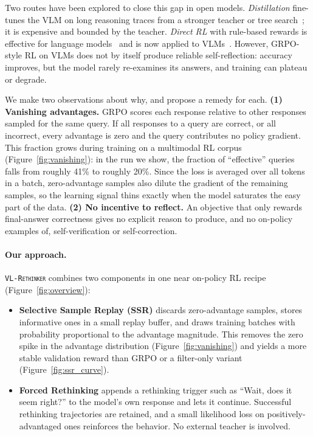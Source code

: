 \documentclass{article}
\newcommand{\model}{\texttt{\textsc{VL-Rethinker}}\xspace}
\begin{document}
Two routes have been explored to close this gap in open models. \emph{Distillation} fine-tunes the VLM on long reasoning traces from a stronger teacher or tree search~\citep{llavacot,Mulberry,R1OneVision,vision-r1,virgo}; it is expensive and bounded by the teacher. \emph{Direct RL} with rule-based rewards is effective for language models~\citep{deepseek-r1,simplerl,open-reasoner-zero,deepscaler2025} and is now applied to VLMs~\citep{mmeureka,lmm-r1,r1vl,OpenVLThinker}. However, GRPO-style RL on VLMs does not by itself produce reliable self-reflection: accuracy improves, but the model rarely re-examines its answers, and training can plateau or degrade.

We make two observations about why, and propose a remedy for each. \textbf{(1) Vanishing advantages.} GRPO scores each response relative to other responses sampled for the same query. If all responses to a query are correct, or all incorrect, every advantage is zero and the query contributes no policy gradient. This fraction grows during training on a multimodal RL corpus (Figure~\ref{fig:vanishing}): in the run we show, the fraction of ``effective'' queries falls from roughly 41\% to roughly 20\%. Since the loss is averaged over all tokens in a batch, zero-advantage samples also dilute the gradient of the remaining samples, so the learning signal thins exactly when the model saturates the easy part of the data. \textbf{(2) No incentive to reflect.} An objective that only rewards final-answer correctness gives no explicit reason to produce, and no on-policy examples of, self-verification or self-correction.

\paragraph{Our approach.} \model combines two components in one near on-policy RL recipe (Figure~\ref{fig:overview}):
\begin{itemize}[leftmargin=*,itemsep=1pt,topsep=2pt]
\item \textbf{Selective Sample Replay (SSR)} discards zero-advantage samples, stores informative ones in a small replay buffer, and draws training batches with probability proportional to the advantage magnitude. This removes the zero spike in the advantage distribution (Figure~\ref{fig:vanishing}) and yields a more stable validation reward than GRPO or a filter-only variant (Figure~\ref{fig:ssr_curve}).
\item \textbf{Forced Rethinking} appends a rethinking trigger such as ``Wait, does it seem right?'' to the model's own response and lets it continue. Successful rethinking trajectories are retained, and a small likelihood loss on positively-advantaged ones reinforces the behavior. No external teacher is involved.
\end{itemize}
\end{document}
